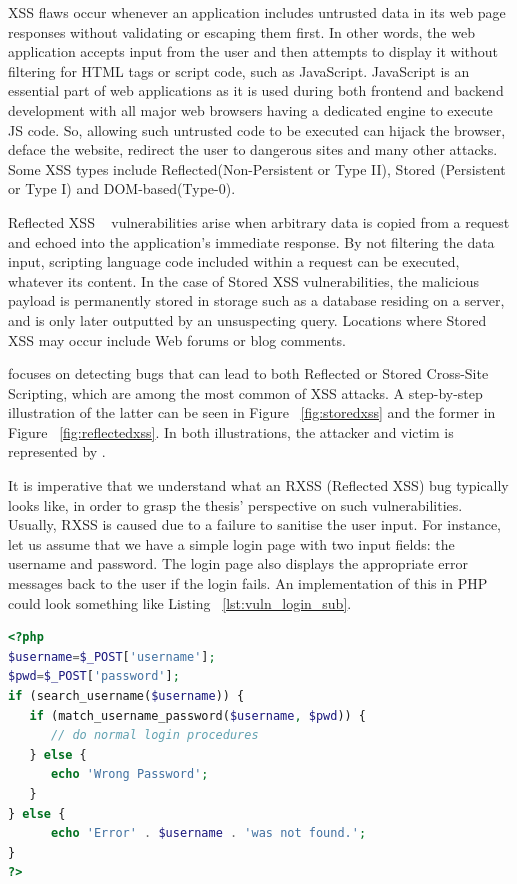 XSS flaws occur whenever an application includes untrusted data in its web page responses without validating or escaping them first. In other words, the web application accepts input from the user and then attempts to display it without filtering for HTML tags or script code, such as JavaScript. JavaScript is an essential part of web applications as it is used during both frontend and backend development with all major web browsers having a dedicated engine to execute JS code. So, allowing such untrusted code to be executed can hijack the browser, deface the website, redirect the user to dangerous sites and many other attacks. Some XSS types include Reflected(Non-Persistent or Type II), Stored (Persistent or Type I) and DOM-based(Type-0).

Reflected XSS ~\cite{rxss_def} vulnerabilities arise when arbitrary data is copied from a request and echoed into the application's immediate response. By not filtering the data input, scripting language code included within a request can be executed, whatever its content. In the case of Stored XSS vulnerabilities, the malicious payload is permanently stored in storage such as a database residing on a server, and is only later outputted by an unsuspecting query. Locations where Stored XSS may occur include Web forums or blog comments. 

\pname{} focuses on detecting bugs that can lead to both Reflected or Stored Cross-Site Scripting, which are among the most common of XSS attacks. A step-by-step illustration of the latter can be seen in Figure ~\ref{fig:storedxss} and the former in Figure ~\ref{fig:reflectedxss}. In both illustrations, the attacker and victim is represented by \pname{}.

It is imperative that we understand what an RXSS (Reflected XSS) bug typically looks like, in order to grasp the thesis' perspective on such vulnerabilities. Usually, RXSS is caused due to a failure to sanitise the user input. For instance, let us assume that we have a simple login page with two input fields: the username and password. The login page also displays the appropriate error messages back to the user if the login fails. An implementation of this in PHP could look something like Listing ~\ref{lst:vuln_login_sub}.

\begin{lstlisting}[aboveskip=\baselineskip, showstringspaces=false, frame=single, language=PHP, caption={\textit{Vulnerable login form}}, numberstyle=\color{gray}, numbersep=5pt, label={lst:vuln_login_sub}]
<?php
$username=$_POST['username'];
$pwd=$_POST['password'];
if (search_username($username)) {
   if (match_username_password($username, $pwd)) {
      // do normal login procedures
   } else {
      echo 'Wrong Password';
   }
} else {
      echo 'Error' . $username . 'was not found.';
}
?>
\end{lstlisting}

